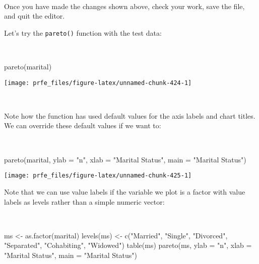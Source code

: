\documentclass[
  12pt,
  a4paper]{book}
\newenvironment{Shaded}{\begin{snugshade}}{\end{snugshade}}
\newcommand{\AttributeTok}[1]{\textcolor[rgb]{0.77,0.63,0.00}{#1}}
\newcommand{\FunctionTok}[1]{\textcolor[rgb]{0.00,0.00,0.00}{#1}}
\newcommand{\NormalTok}[1]{#1}
\newcommand{\OtherTok}[1]{\textcolor[rgb]{0.56,0.35,0.01}{#1}}
\newcommand{\StringTok}[1]{\textcolor[rgb]{0.31,0.60,0.02}{#1}}
\begin{document}
~

Once you have made the changes shown above, check your work, save the file, and quit the editor.

\newpage

Let's try the \texttt{pareto()} function with the test data:

~

\begin{Shaded}
\begin{Highlighting}[]
\FunctionTok{pareto}\NormalTok{(marital)}
\end{Highlighting}
\end{Shaded}

\begin{center}\texttt{[image: prfe\_files/figure-latex/unnamed-chunk-424-1]} \end{center}

~

Note how the function has used default values for the axis labels and chart titles. We can override these default values if we want to:

~

\begin{Shaded}
\begin{Highlighting}[]
\FunctionTok{pareto}\NormalTok{(marital, }\AttributeTok{ylab =} \StringTok{"n"}\NormalTok{, }\AttributeTok{xlab =} \StringTok{"Marital Status"}\NormalTok{,}
       \AttributeTok{main =} \StringTok{"Marital Status"}\NormalTok{)}
\end{Highlighting}
\end{Shaded}

\begin{center}\texttt{[image: prfe\_files/figure-latex/unnamed-chunk-425-1]} \end{center}

\newpage

Note that we can use value labels if the variable we plot is a factor with value labels as levels rather than a simple numeric vector:

~

\begin{Shaded}
\begin{Highlighting}[]
\NormalTok{ms }\OtherTok{\textless{}{-}} \FunctionTok{as.factor}\NormalTok{(marital)}
\FunctionTok{levels}\NormalTok{(ms) }\OtherTok{\textless{}{-}} \FunctionTok{c}\NormalTok{(}\StringTok{"Married"}\NormalTok{, }\StringTok{"Single"}\NormalTok{, }\StringTok{"Divorced"}\NormalTok{, }\StringTok{"Separated"}\NormalTok{,}
                \StringTok{"Cohabiting"}\NormalTok{, }\StringTok{"Widowed"}\NormalTok{)}
\FunctionTok{table}\NormalTok{(ms)}
\FunctionTok{pareto}\NormalTok{(ms, }\AttributeTok{ylab =} \StringTok{"n"}\NormalTok{, }\AttributeTok{xlab =} \StringTok{"Marital Status"}\NormalTok{,}
       \AttributeTok{main =} \StringTok{"Marital Status"}\NormalTok{)}
\end{Highlighting}
\end{Shaded}
\end{document}
